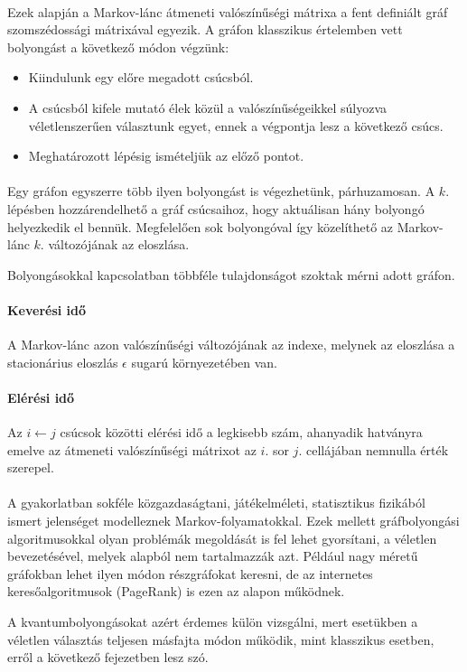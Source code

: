 \paragraph{}

Ezek alapján a Markov-lánc átmeneti valószínűségi mátrixa a fent definiált gráf
szomszédossági mátrixával egyezik. A gráfon klasszikus értelemben vett
bolyongást a következő módon végzünk:

\begin{itemize}
  \item Kiindulunk egy előre megadott csúcsból.
  \item A csúcsból kifele mutató élek közül a valószínűségeikkel súlyozva
        véletlenszerűen választunk egyet, ennek a végpontja lesz a következő csúcs.
  \item Meghatározott lépésig ismételjük az előző pontot.
\end{itemize}

\paragraph{}

Egy gráfon egyszerre több ilyen bolyongást is végezhetünk, párhuzamosan. A $k.$
lépésben hozzárendelhető a gráf csúcsaihoz, hogy aktuálisan hány bolyongó
helyezkedik el bennük. Megfelelően sok bolyongóval így közelíthető az
Markov-lánc $k.$ változójának az eloszlása.

Bolyongásokkal kapcsolatban többféle tulajdonságot szoktak mérni adott gráfon.

\paragraph{Keverési idő} A Markov-lánc azon valószínűségi változójának az
indexe, melynek az eloszlása a stacionárius eloszlás $\epsilon$ sugarú
környezetében van.

\paragraph{Elérési idő} Az $i \leftarrow j$ csúcsok közötti elérési idő a
legkisebb szám, ahanyadik hatványra emelve az átmeneti valószínűségi mátrixot
az $i.$ sor $j.$ cellájában nemnulla érték szerepel.

\paragraph{}

A gyakorlatban sokféle közgazdaságtani, játékelméleti, statisztikus fizikából
ismert jelenséget modelleznek Markov-folyamatokkal. Ezek mellett gráfbolyongási
algoritmusokkal olyan problémák megoldását is fel lehet gyorsítani, a véletlen
bevezetésével, melyek alapból nem tartalmazzák azt. Például nagy méretű
gráfokban lehet ilyen módon részgráfokat keresni, de az internetes
keresőalgoritmusok (PageRank) is ezen az alapon működnek.

A kvantumbolyongásokat azért érdemes külön vizsgálni, mert esetükben a véletlen
választás teljesen másfajta módon működik, mint klasszikus esetben, erről a
következő fejezetben lesz szó.
